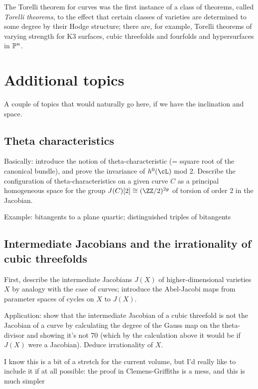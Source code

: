 The Torelli theorem for curves was the first instance of a class of theorems, called \emph{Torelli theorems}, to the effect that certain classes of varieties are determined to some degree by their Hodge structure; there are, for example, Torelli theorems of varying strength for K3 surfaces, cubic threefolds and fourfolds and hypersurfaces in $\PP^n$.

\section{Additional topics}

A couple of topics that would naturally go here, if we have the inclination and space.

\subsection{Theta characteristics}

Basically: introduce the notion of theta-characteristic (= square root of the canonical bundle), and prove the invariance of $h^0(\cL)$ mod 2. Describe the configuration of theta-characteristics on a given curve $C$ as a principal homogeneous space for the group $J(C)[2] \cong (\ZZ/2)^{2g}$ of torsion of order 2 in the Jacobian.

Example: bitangents to a plane quartic; distinguished triples of bitangents

\subsection{Intermediate Jacobians and the irrationality of cubic threefolds}

First, describe the intermediate Jacobians $J(X)$ of higher-dimensional varieties $X$ by analogy with the case of curves; introduce the Abel-Jacobi maps from parameter spaces of cycles on $X$ to $J(X)$.

Application: show that the intermediate Jacobian of a cubic threefold is not the Jacobian of a curve by calculating the degree of the Gauss map on the theta-divisor and showing it's not 70 (which by the calculation above it would be if $J(X)$ were a Jacobian). Deduce irrationality of $X$.

I know this is a bit of a stretch for the current volume, but I'd really like to include it if at all possible: the proof in Clemens-Griffiths is a mess, and this is much simpler



